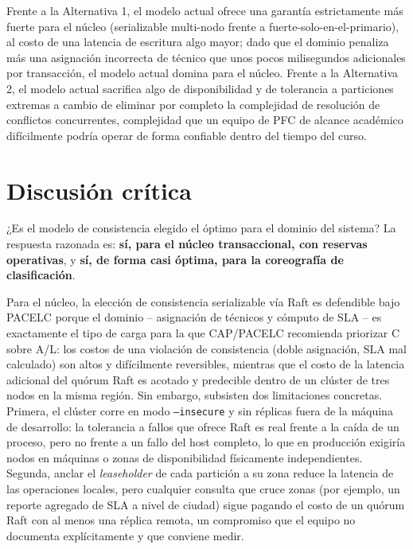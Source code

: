 \documentclass[11pt,a4paper]{article}
\begin{document}
Frente a la Alternativa 1, el modelo actual ofrece una garant\'ia estrictamente m\'as fuerte para
el n\'ucleo (serializable multi-nodo frente a fuerte-solo-en-el-primario), al costo de una latencia
de escritura algo mayor; dado que el dominio penaliza m\'as una asignaci\'on incorrecta de t\'ecnico
que unos pocos milisegundos adicionales por transacci\'on, el modelo actual domina para el
n\'ucleo. Frente a la Alternativa 2, el modelo actual sacrifica algo de disponibilidad y de
tolerancia a particiones extremas a cambio de eliminar por completo la complejidad de resoluci\'on
de conflictos concurrentes, complejidad que un equipo de PFC de alcance acad\'emico dif\'icilmente
podr\'ia operar de forma confiable dentro del tiempo del curso.

\section{Discusi\'on cr\'itica}
\label{sec:discusion}

¿Es el modelo de consistencia elegido el \'optimo para el dominio del sistema? La respuesta
razonada es: \textbf{s\'i, para el n\'ucleo transaccional, con reservas operativas}, y
\textbf{s\'i, de forma casi \'optima, para la coreograf\'ia de clasificaci\'on}.

Para el n\'ucleo, la elecci\'on de consistencia serializable v\'ia Raft es defendible bajo PACELC
porque el dominio -- asignaci\'on de t\'ecnicos y c\'omputo de SLA -- es exactamente el tipo de
carga para la que CAP/PACELC recomienda priorizar C sobre A/L: los costos de una violaci\'on de
consistencia (doble asignaci\'on, SLA mal calculado) son altos y dif\'icilmente reversibles,
mientras que el costo de la latencia adicional del qu\'orum Raft es acotado y predecible dentro de
un cl\'uster de tres nodos en la misma regi\'on. Sin embargo, subsisten dos limitaciones concretas.
Primera, el cl\'uster corre en modo \texttt{--insecure} y sin r\'eplicas fuera de la m\'aquina de
desarrollo: la tolerancia a fallos que ofrece Raft es real frente a la ca\'ida de un proceso, pero
no frente a un fallo del host completo, lo que en producci\'on exigir\'ia nodos en m\'aquinas o
zonas de disponibilidad f\'isicamente independientes. Segunda, anclar el \emph{leaseholder} de
cada partici\'on a su zona reduce la latencia de las operaciones locales, pero cualquier consulta
que cruce zonas (por ejemplo, un reporte agregado de SLA a nivel de ciudad) sigue pagando el costo
de un qu\'orum Raft con al menos una r\'eplica remota, un compromiso que el equipo no documenta
expl\'icitamente y que conviene medir.
\end{document}
